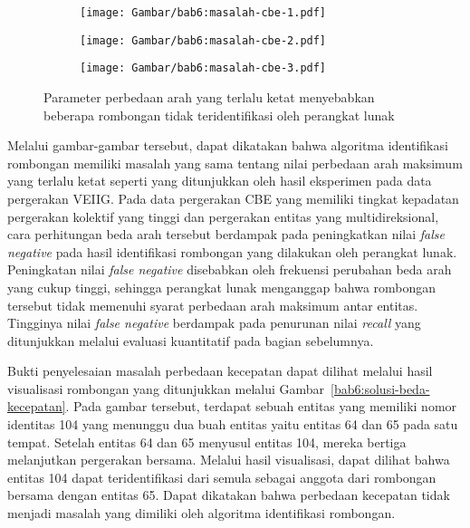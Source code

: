 \begin{figure}[h]
    \centering
    \captionsetup{width=.75\textwidth}
    \begin{subfigure}[h]{0.275\textwidth}
        \centering
        \texttt{[image: Gambar/bab6:masalah-cbe-1.pdf]}
    \end{subfigure}
    \begin{subfigure}[h]{0.275\textwidth}
        \centering
        \texttt{[image: Gambar/bab6:masalah-cbe-2.pdf]}
    \end{subfigure}
    \begin{subfigure}[h]{0.275\textwidth}
        \centering
        \texttt{[image: Gambar/bab6:masalah-cbe-3.pdf]}
    \end{subfigure}
    \caption[Masalah syarat perbedaan arah maksimum pada data CBE]{Parameter perbedaan arah yang terlalu ketat menyebabkan beberapa rombongan tidak teridentifikasi oleh perangkat lunak}
    \label{bab6:masalah-cbe}
\end{figure}

Melalui gambar-gambar tersebut, dapat dikatakan bahwa algoritma identifikasi rombongan memiliki masalah yang sama tentang nilai perbedaan arah maksimum yang terlalu ketat seperti yang ditunjukkan oleh hasil eksperimen pada data pergerakan VEIIG. Pada data pergerakan CBE yang memiliki tingkat kepadatan pergerakan kolektif yang tinggi dan pergerakan entitas yang multidireksional, cara perhitungan beda arah tersebut berdampak pada peningkatkan nilai \textit{false negative} pada hasil identifikasi rombongan yang dilakukan oleh perangkat lunak. Peningkatan nilai \textit{false negative} disebabkan oleh frekuensi perubahan beda arah yang cukup tinggi, sehingga perangkat lunak menganggap bahwa rombongan tersebut tidak memenuhi syarat perbedaan arah maksimum antar entitas. Tingginya nilai \textit{false negative} berdampak pada penurunan nilai \textit{recall} yang ditunjukkan melalui evaluasi kuantitatif pada bagian sebelumnya.

Bukti penyelesaian masalah perbedaan kecepatan dapat dilihat melalui hasil visualisasi rombongan yang ditunjukkan melalui Gambar~\ref{bab6:solusi-beda-kecepatan}. Pada gambar tersebut, terdapat sebuah entitas yang memiliki nomor identitas 104 yang menunggu dua buah entitas yaitu entitas 64 dan 65 pada satu tempat. Setelah entitas 64 dan 65 menyusul entitas 104, mereka bertiga melanjutkan pergerakan bersama. Melalui hasil visualisasi, dapat dilihat bahwa entitas 104 dapat teridentifikasi dari semula sebagai anggota dari rombongan bersama dengan entitas 65. Dapat dikatakan bahwa perbedaan kecepatan tidak menjadi masalah yang dimiliki oleh algoritma identifikasi rombongan.

